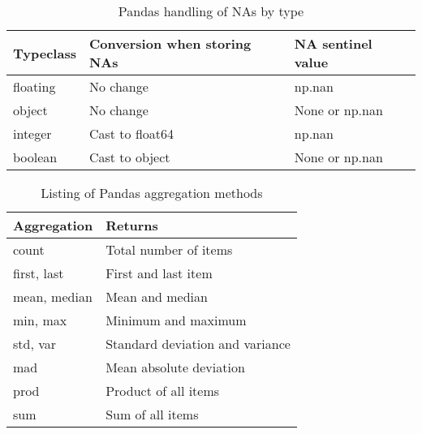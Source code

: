 \begin{table}
    \centering
    \caption{Pandas handling of NAs by type}
    \label{Pandas handling of NAs by type}
    \begin{tabular}{lll}
        \hline
        Typeclass & Conversion when storing NAs & NA sentinel value \\
        \hline
        floating  & No change                   & np.nan            \\
        object    & No change                   & None or np.nan    \\
        integer   & Cast to float64             & np.nan            \\
        boolean   & Cast to object              & None or np.nan    \\
        \hline
    \end{tabular}
\end{table}


\begin{table}
    \centering
    \caption{Listing of Pandas aggregation methods}
    \label{Listing of Pandas aggregation methods}
    \begin{tabular}{ll}
        \hline
        Aggregation  & Returns                         \\
        \hline
        count        & Total number of items           \\
        first, last  & First and last item             \\
        mean, median & Mean and median                 \\
        min, max     & Minimum and maximum             \\
        std, var     & Standard deviation and variance \\
        mad          & Mean absolute deviation         \\
        prod         & Product of all items            \\
        sum          & Sum of all items                \\
        \hline
    \end{tabular}
\end{table}